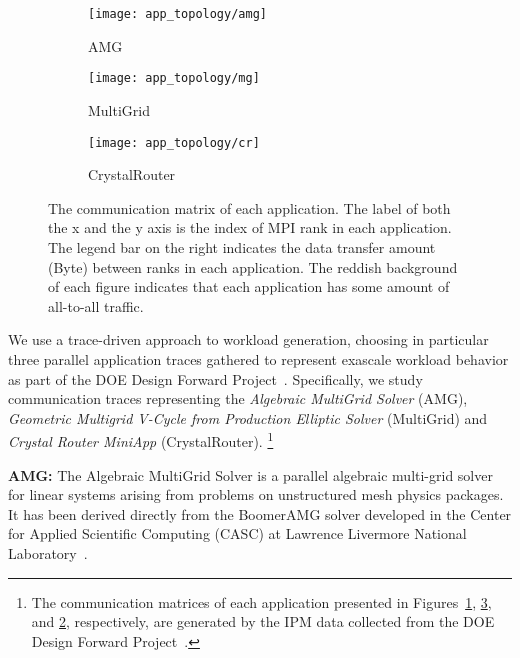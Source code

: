 \begin{figure*}[th!]
    \centering
    \begin{subfigure}[t]{0.32\textwidth}
        \centering
        \texttt{[image: app\_topology/amg]}
        \caption{AMG}
        \label{fig:amg-communication-topology}
    \end{subfigure}%
    \begin{subfigure}[t]{0.32\textwidth}
        \centering
        \texttt{[image: app\_topology/mg]}
        \caption{MultiGrid}
        \label{fig:mg-communication-topology}
    \end{subfigure}%
    \begin{subfigure}[t]{0.32\textwidth}
        \centering
        \texttt{[image: app\_topology/cr]}
        \caption{CrystalRouter}
        \label{fig:cr-communication-topology}
    \end{subfigure}%
    \caption{
The communication matrix of each application. The label of both the x and the y axis is the index of MPI rank in each application. 
The legend bar on the right indicates the data transfer amount (Byte) between ranks in each application. The reddish background of each figure indicates that each application has some amount of all-to-all traffic.
}
   \label{fig:applications_communication_matrix}
\end{figure*}


We use a trace-driven approach to workload generation, choosing in particular three parallel application traces gathered to represent exascale workload behavior as part of the DOE Design Forward Project~\cite{designforward-webpage,designforward-traces}. Specifically, we study communication traces representing the \emph{Algebraic MultiGrid Solver} (AMG), \emph{Geometric Multigrid V-Cycle from Production Elliptic Solver} (MultiGrid) and \emph{Crystal Router MiniApp} (CrystalRouter). \footnote{The communication matrices of each application presented in Figures~\ref{fig:amg-communication-topology}, \ref{fig:cr-communication-topology}, and \ref{fig:mg-communication-topology}, respectively, are generated by the IPM data collected from the DOE Design Forward Project~\cite{designforward-traces}. }

\textbf{AMG:} The Algebraic MultiGrid Solver is a parallel algebraic multi-grid solver for linear systems arising from problems on unstructured mesh physics packages. It has been derived directly from the BoomerAMG solver developed in the Center for Applied Scientific Computing (CASC) at Lawrence Livermore National Laboratory~\cite{amg}. 

